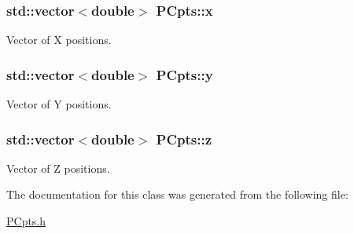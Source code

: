 \subsubsection[{\texorpdfstring{x}{x}}]{\setlength{\rightskip}{0pt plus 5cm}std\+::vector$<$double$>$ P\+Cpts\+::x}\hypertarget{class_p_cpts_a7459bb949ae0be96438f824af93e0e59}{}\label{class_p_cpts_a7459bb949ae0be96438f824af93e0e59}


Vector of X positions. 

\subsubsection[{\texorpdfstring{y}{y}}]{\setlength{\rightskip}{0pt plus 5cm}std\+::vector$<$double$>$ P\+Cpts\+::y}\hypertarget{class_p_cpts_aec4c018ef9941935b44ec08485153d2a}{}\label{class_p_cpts_aec4c018ef9941935b44ec08485153d2a}


Vector of Y positions. 

\subsubsection[{\texorpdfstring{z}{z}}]{\setlength{\rightskip}{0pt plus 5cm}std\+::vector$<$double$>$ P\+Cpts\+::z}\hypertarget{class_p_cpts_a2a4a9dc779fe86b5583c27bb19cf1d9f}{}\label{class_p_cpts_a2a4a9dc779fe86b5583c27bb19cf1d9f}


Vector of Z positions. 



The documentation for this class was generated from the following file\+:\begin{DoxyCompactItemize}
\item 
\hyperlink{_p_cpts_8h}{P\+Cpts.\+h}\end{DoxyCompactItemize}
